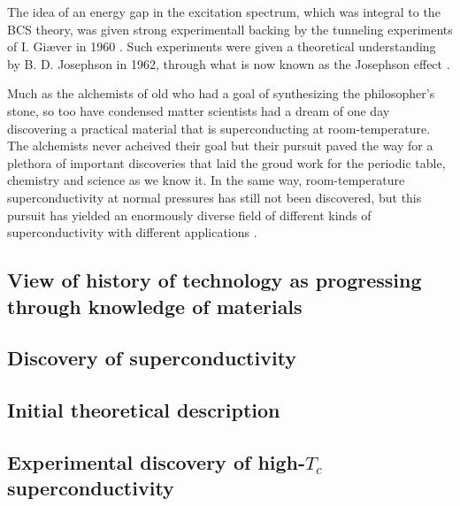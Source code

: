 The idea of an energy gap in the excitation spectrum, which was integral to the BCS theory, was given strong experimentall backing by the tunneling
experiments of I. Giæver in 1960 \cite{Giaever60}.
Such experiments were given a theoretical understanding by B. D. Josephson in 1962, through what is now known as the Josephson effect
\cite{Josephson62}. 

Much as the alchemists of old who had a goal of synthesizing the philosopher's stone, so too have condensed matter scientists had a dream
of one day discovering a practical material that is superconducting at room-temperature. The alchemists never acheived their goal but their
pursuit paved the way for a plethora of important discoveries that laid the groud work for the periodic table, chemistry and science
as we know it. In the same way, room-temperature superconductivity at normal pressures has still not been discovered, but this pursuit
has yielded an enormously diverse field of different kinds of superconductivity with different applications \cite{Moran05}.

\subsection{View of history of technology as progressing through knowledge of materials}

\subsection{Discovery of superconductivity}

\subsection{Initial theoretical description}


\subsection{Experimental discovery of high-$T_c$ superconductivity}


